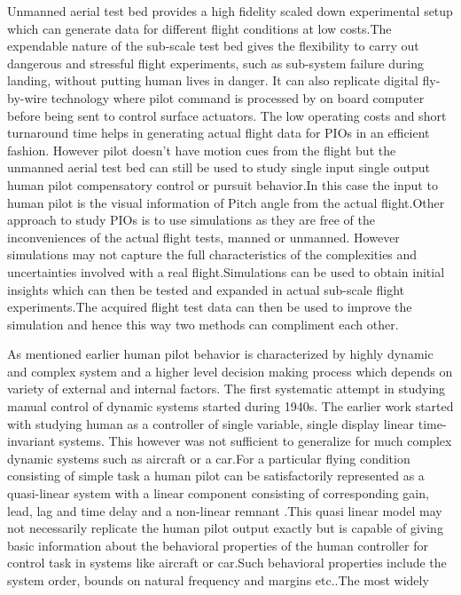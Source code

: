 \par Unmanned aerial test bed provides a high fidelity scaled down experimental setup which can generate data for different flight conditions at low costs.The expendable nature of the sub-scale test bed gives the flexibility to carry out dangerous and stressful flight experiments, such as sub-system failure during landing, without putting human lives in danger. It can also replicate digital fly-by-wire technology where pilot command is processed by on board computer before being sent to control surface actuators. The low operating costs and short turnaround time helps in generating actual flight data for PIOs in an efficient fashion\cite{mandal2013flight}. However pilot doesn't have motion cues from the flight but the unmanned aerial test bed can still be used to study single input single output human pilot compensatory control or pursuit behavior.In this case the input to human pilot is the visual information of Pitch angle from the actual flight.Other approach to study PIOs is to use simulations\cite{McRuerPIO} as they are free of the inconveniences of the actual flight tests, manned or unmanned. However simulations may not capture the full characteristics of the complexities and uncertainties involved with a real flight\cite{mcruer1997aviation}.Simulations can be used to obtain initial insights which can then be tested and expanded in actual sub-scale flight experiments.The acquired flight test data can then be used to improve the simulation and hence this way two methods can compliment each other.
\par As mentioned earlier human pilot behavior is characterized by highly dynamic and complex system and a higher level decision making process which depends on variety of external and internal factors\cite{stapleford1969experiments}\cite{kleinman1971control}\cite{johannsen1994theoretical}. The first systematic attempt in studying manual control of dynamic systems started during 1940s. The earlier work started with studying human as a controller of single variable, single display linear time-invariant systems. This however was not sufficient to generalize for much complex dynamic systems such as aircraft or a car\cite{land1994we}\cite{sentouh2009sensorimotor}.For  a  particular  flying 
condition consisting of simple task a human pilot can be satisfactorily represented as a quasi-linear system with a linear component consisting of corresponding gain, lead, lag and time delay and a non-linear remnant \cite{hess1990control}.This quasi linear model may not necessarily replicate the human pilot output exactly but is capable  of giving basic information about the behavioral properties of the human controller for control task in  systems like aircraft or car\cite{mcruer1967review}.Such behavioral properties include the system order, bounds on natural frequency and margins etc.\cite{shappell2012human}\cite{mcruer1969theory}\cite{hosman1999pilot}\cite{kleinman1971control}.The most widely 

